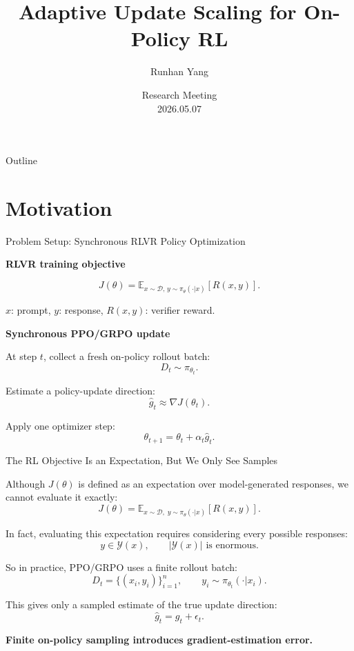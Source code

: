 \documentclass[aspectratio=169]{beamer}
\title{Adaptive Update Scaling for On-Policy RL}
\author{Runhan Yang}
\institute{CUHK--Shenzhen, SLAI}
\date{Research Meeting\\ 2026.05.07}
\begin{document}
\begin{frame}
  \titlepage
\end{frame}

\begin{frame}{Outline}
  \tableofcontents
\end{frame}

\section{Motivation}

\begin{frame}{Problem Setup: Synchronous RLVR Policy Optimization}
\small

\textbf{RLVR training objective}

\[
J(\theta)
=
\mathbb{E}_{x\sim\mathcal D,\,y\sim\pi_\theta(\cdot|x)}
\!\left[
R(x,y)
\right].
\]

{\footnotesize\color{Muted}
\(x\): prompt,\quad
\(y\): response,\quad
\(R(x,y)\): verifier reward.
}


\textbf{Synchronous PPO/GRPO update}

At step \(t\), collect a fresh on-policy rollout batch:
\[
D_t \sim \pi_{\theta_t}.
\]

Estimate a policy-update direction:
\[
\hat g_t \approx \nabla J(\theta_t).
\]

Apply one optimizer step:
\[
\theta_{t+1}
=
\theta_t
+
\alpha_t \hat g_t .
\]

\end{frame}


\begin{frame}{The RL Objective Is an Expectation, But We Only See Samples}
\small

Although \(J(\theta)\) is defined as an expectation over model-generated responses,
we cannot evaluate it exactly:
\[
J(\theta)
=
\mathbb{E}_{x\sim\mathcal D,\; y\sim\pi_\theta(\cdot|x)}
\left[
R(x,y)
\right].
\]


In fact, evaluating this expectation requires considering every possible responses:
\[
  y \in \mathcal Y(x),
  \qquad
  |\mathcal Y(x)| \text{ is enormous.}
\]


So in practice, PPO/GRPO uses a finite rollout batch:
\[
  D_t=\{(x_i,y_i)\}_{i=1}^{n},
  \qquad
  y_i\sim\pi_{\theta_t}(\cdot|x_i).
\]

This gives only a sampled estimate of the true update direction:
\[
  \hat g_t
  =
  g_t+\epsilon_t .
\]

\begin{center}
\large
\textbf{Finite on-policy sampling introduces gradient-estimation error.}
\end{center}

\end{frame}
\end{document}
